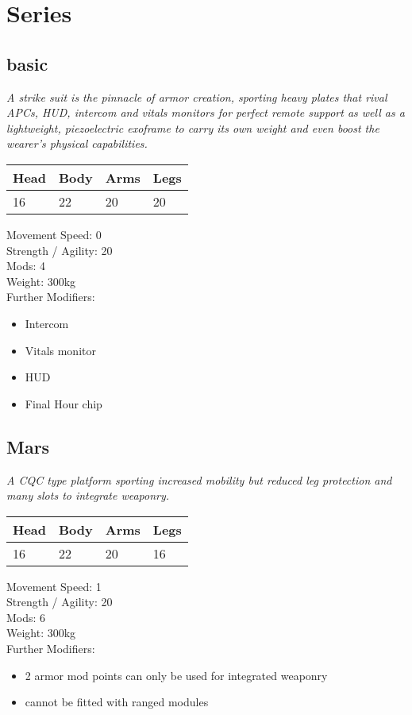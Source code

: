 \documentclass[12pt,a4paper,openany]{book}
\begin{document}
	\section{Series}
	\subsection{basic}
	\textit{A strike suit is the pinnacle of armor creation, sporting heavy plates that rival APCs, HUD, intercom and vitals monitors for perfect remote support as well as a lightweight, piezoelectric exoframe to carry its own weight and even boost the wearer's physical capabilities.}\par
	\begin{tabular}{|l|l|l|l|}
		\hline
		Head & Body & Arms & Legs\\
		\hline
		16 & 22 & 20 & 20\\
		\hline
	\end{tabular}
	\par
	Movement Speed: 0\\
	Strength / Agility: 20\\
	Mods: 4\\
	Weight: 300kg\\
	Further Modifiers:
	\vspace{-8mm}
	\begin{itemize}
		\setlength\itemsep{-8mm}
		\item Intercom
		\item Vitals monitor
		\item HUD
		\item Final Hour chip
	\end{itemize}
	\par
	\subsection{Mars}
	\textit{A CQC type platform sporting increased mobility but reduced leg protection and many slots to integrate weaponry.}\par
	\begin{tabular}{|l|l|l|l|}
		\hline
		Head & Body & Arms & Legs\\
		\hline
		16 & 22 & 20 & 16\\
		\hline
	\end{tabular}
	\par
	Movement Speed: 1\\
	Strength / Agility: 20\\
	Mods: 6\\
	Weight: 300kg\\
	Further Modifiers:
	\vspace{-8mm}
	\begin{itemize}
		\setlength\itemsep{-8mm}
		\item 2 armor mod points can only be used for integrated weaponry
		\item cannot be fitted with ranged modules
	\end{itemize}
	\par
\end{document}
